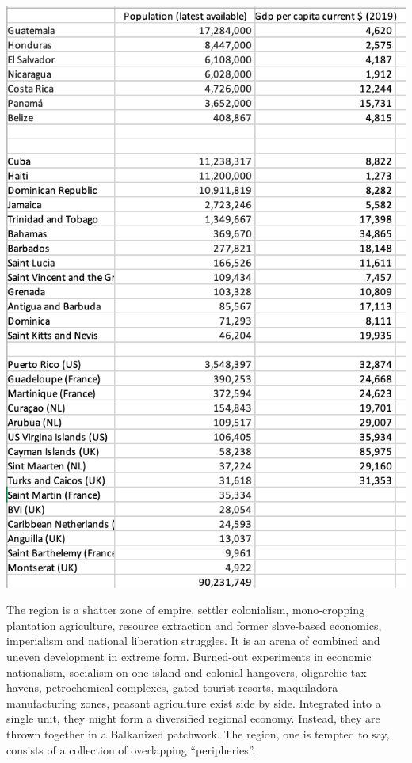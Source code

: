 \documentclass[
]{book}
\begin{document}
\includegraphics{fig/pop_gdp_central_america_caribbean.png}

The region is a shatter zone of empire, settler colonialism, mono-cropping plantation agriculture, resource extraction and former slave-based economics, imperialism and national liberation struggles. It is an arena of combined and uneven development in extreme form. Burned-out experiments in economic nationalism, socialism on one island and colonial hangovers, oligarchic tax havens, petrochemical complexes, gated tourist resorts, maquiladora manufacturing zones, peasant agriculture exist side by side. Integrated into a single unit, they might form a diversified regional economy. Instead, they are thrown together in a Balkanized patchwork. The region, one is tempted to say, consists of a collection of overlapping ``peripheries''.
\end{document}
